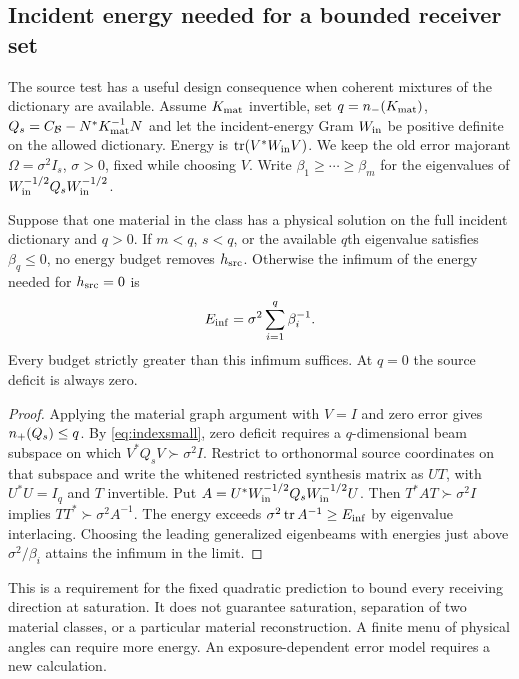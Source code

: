 \subsection{Incident energy needed for a bounded receiver set}
The source test has a useful design consequence when coherent mixtures of the dictionary are available. Assume $K_{\rm mat}$ invertible, set $q=n_-(K_{\rm mat})$, $Q_s=C_{\mathcal B}-N^*K_{\rm mat}^{-1}N$ and let the incident-energy Gram $W_{\rm in}$ be positive definite on the allowed dictionary. Energy is $\operatorname{tr}(V^*W_{\rm in}V)$. We keep the old error majorant $\Omega=\sigma^2 I_s$, $\sigma>0$, fixed while choosing $V$. Write $\beta_1\ge\cdots\ge\beta_m$ for the eigenvalues of $W_{\rm in}^{-1/2}Q_sW_{\rm in}^{-1/2}$.

\begin{corollary}\label{cor:energy}
Suppose that one material in the class has a physical solution on the full incident dictionary and $q>0$. If $m<q$, $s<q$, or the available $q$th eigenvalue satisfies $\beta_q\le0$, no energy budget removes $h_{\rm src}$. Otherwise the infimum of the energy needed for $h_{\rm src}=0$ is
\begin{equation}
 E_{\rm inf}=\sigma^2\sum_{i=1}^{q}\beta_i^{-1}.
 \label{eq:energy}
\end{equation}
Every budget strictly greater than this infimum suffices. At $q=0$ the source deficit is always zero.
\end{corollary}
\begin{proof}
Applying the material graph argument with $V=I$ and zero error gives $n_+(Q_s)\le q$. By \eqref{eq:indexsmall}, zero deficit requires a $q$-dimensional beam subspace on which $V^*Q_sV\succ\sigma^2 I$. Restrict to orthonormal source coordinates on that subspace and write the whitened restricted synthesis matrix as $UT$, with $U^*U=I_q$ and $T$ invertible. Put $A=U^*W_{\rm in}^{-1/2}Q_sW_{\rm in}^{-1/2}U$. Then $T^*AT\succ\sigma^2 I$ implies $TT^*\succ\sigma^2 A^{-1}$. The energy exceeds $\sigma^2\operatorname{tr} A^{-1}\ge E_{\rm inf}$ by eigenvalue interlacing. Choosing the leading generalized eigenbeams with energies just above $\sigma^2/\beta_i$ attains the infimum in the limit.
\end{proof}
This is a requirement for the fixed quadratic prediction to bound every receiving direction at saturation. It does not guarantee saturation, separation of two material classes, or a particular material reconstruction. A finite menu of physical angles can require more energy. An exposure-dependent error model requires a new calculation.
